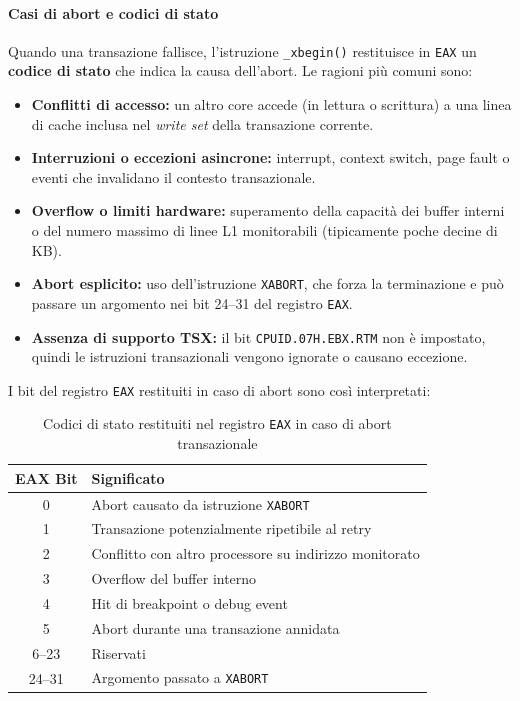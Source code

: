 \paragraph{Casi di abort e codici di stato}
Quando una transazione fallisce, l’istruzione \texttt{\_xbegin()} restituisce in \texttt{EAX} un \textbf{codice di stato} che indica la causa dell’abort.
Le ragioni più comuni sono:

\begin{itemize}
  \item \textbf{Conflitti di accesso:} un altro core accede (in lettura o scrittura) a una linea di cache inclusa nel \emph{write set} della transazione corrente.
  \item \textbf{Interruzioni o eccezioni asincrone:} interrupt, context switch, page fault o eventi che invalidano il contesto transazionale.
  \item \textbf{Overflow o limiti hardware:} superamento della capacità dei buffer interni o del numero massimo di linee L1 monitorabili (tipicamente poche decine di KB).
  \item \textbf{Abort esplicito:} uso dell’istruzione \texttt{XABORT}, che forza la terminazione e può passare un argomento nei bit 24–31 del registro \texttt{EAX}.
  \item \textbf{Assenza di supporto TSX:} il bit \texttt{CPUID.07H.EBX.RTM} non è impostato, quindi le istruzioni transazionali vengono ignorate o causano eccezione.
\end{itemize}

\noindent
I bit del registro \texttt{EAX} restituiti in caso di abort sono così interpretati:

\begin{table}[H]
\centering
\begin{tabular}{c|l}
\textbf{EAX Bit} & \textbf{Significato} \\
\hline
0 & Abort causato da istruzione \texttt{XABORT} \\
1 & Transazione potenzialmente ripetibile al retry \\
2 & Conflitto con altro processore su indirizzo monitorato \\
3 & Overflow del buffer interno \\
4 & Hit di breakpoint o debug event \\
5 & Abort durante una transazione annidata \\
6--23 & Riservati \\
24--31 & Argomento passato a \texttt{XABORT} \\
\end{tabular}
\caption{Codici di stato restituiti nel registro \texttt{EAX} in caso di abort transazionale}
\label{tab:tsx_abort_codes}
\end{table}

